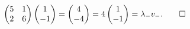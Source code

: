 \begin{loesung}
\begin{align*}
\begin{pmatrix}
5&1\\
2&6
\end{pmatrix}
\begin{pmatrix}1\\-1\end{pmatrix}
=
\begin{pmatrix}4\\-4\end{pmatrix}
=
4\begin{pmatrix}1\\-1\end{pmatrix}
=
\lambda_-v_-.
\qedhere
\end{align*}
\end{loesung}

\begin{bewertung}
\end{bewertung}

